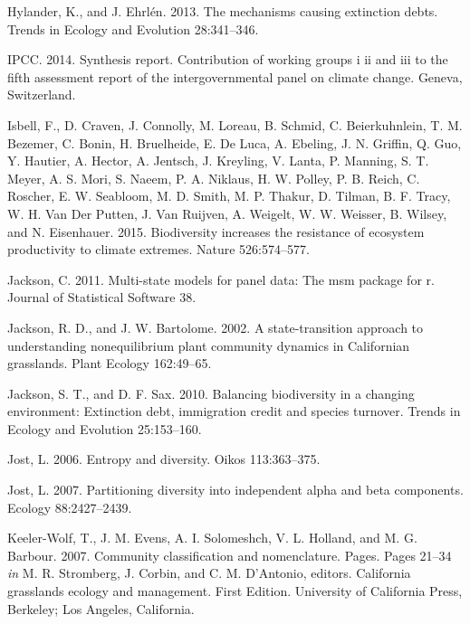 \documentclass[twoside,12pt,final]{ucthesis-CA2012}
\newlength{\cslhangindent}
\newenvironment{cslreferences}%
  {\setlength{\parindent}{0pt}%
  \everypar{\setlength{\hangindent}{\cslhangindent}}\ignorespaces}%
  {\par}
\begin{document}
\begin{ucmainmatter}
\begin{cslreferences}
\leavevmode\hypertarget{ref-hylander2013}{}%
Hylander, K., and J. Ehrlén. 2013. The mechanisms causing extinction debts. Trends in Ecology and Evolution 28:341--346.

\leavevmode\hypertarget{ref-IPCC2014}{}%
IPCC. 2014. Synthesis report. Contribution of working groups i ii and iii to the fifth assessment report of the intergovernmental panel on climate change. Geneva, Switzerland.

\leavevmode\hypertarget{ref-Isbell2015}{}%
Isbell, F., D. Craven, J. Connolly, M. Loreau, B. Schmid, C. Beierkuhnlein, T. M. Bezemer, C. Bonin, H. Bruelheide, E. De Luca, A. Ebeling, J. N. Griffin, Q. Guo, Y. Hautier, A. Hector, A. Jentsch, J. Kreyling, V. Lanta, P. Manning, S. T. Meyer, A. S. Mori, S. Naeem, P. A. Niklaus, H. W. Polley, P. B. Reich, C. Roscher, E. W. Seabloom, M. D. Smith, M. P. Thakur, D. Tilman, B. F. Tracy, W. H. Van Der Putten, J. Van Ruijven, A. Weigelt, W. W. Weisser, B. Wilsey, and N. Eisenhauer. 2015. Biodiversity increases the resistance of ecosystem productivity to climate extremes. Nature 526:574--577.

\leavevmode\hypertarget{ref-Jackson2011}{}%
Jackson, C. 2011. Multi-state models for panel data: The msm package for r. Journal of Statistical Software 38.

\leavevmode\hypertarget{ref-Jackson2002}{}%
Jackson, R. D., and J. W. Bartolome. 2002. A state-transition approach to understanding nonequilibrium plant community dynamics in Californian grasslands. Plant Ecology 162:49--65.

\leavevmode\hypertarget{ref-jackson2010}{}%
Jackson, S. T., and D. F. Sax. 2010. Balancing biodiversity in a changing environment: Extinction debt, immigration credit and species turnover. Trends in Ecology and Evolution 25:153--160.

\leavevmode\hypertarget{ref-jost2006}{}%
Jost, L. 2006. Entropy and diversity. Oikos 113:363--375.

\leavevmode\hypertarget{ref-jost2007}{}%
Jost, L. 2007. Partitioning diversity into independent alpha and beta components. Ecology 88:2427--2439.

\leavevmode\hypertarget{ref-keeler-wolf2007}{}%
Keeler-Wolf, T., J. M. Evens, A. I. Solomeshch, V. L. Holland, and M. G. Barbour. 2007. Community classification and nomenclature. Pages. Pages 21--34 \emph{in} M. R. Stromberg, J. Corbin, and C. M. D'Antonio, editors. California grasslands ecology and management. First Edition. University of California Press, Berkeley; Los Angeles, California.


\end{cslreferences}
\end{ucmainmatter}
\end{document}
